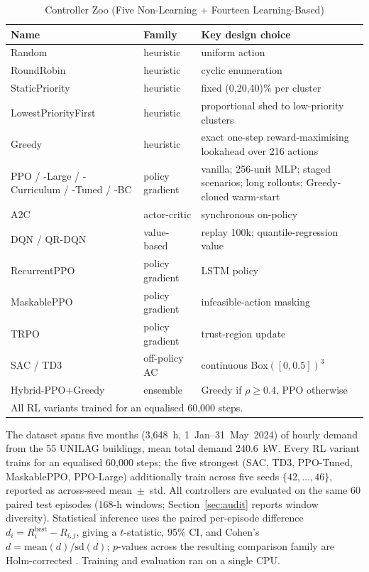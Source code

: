 \documentclass[9pt,conference]{IEEEtran}
\begin{document}
\begin{table}[tbp]
\caption{Controller Zoo (Five Non-Learning + Fourteen Learning-Based)}
\label{tab:zoo}
\begin{center}
\scriptsize
\begin{tabular}{|p{2.1cm}|p{1.3cm}|p{3.6cm}|}
\hline
\textbf{Name} & \textbf{Family} & \textbf{Key design choice} \\
\hline
Random & heuristic & uniform action \\
Round\-Robin & heuristic & cyclic enumeration \\
Static\-Priority & heuristic & fixed (0,20,40)\% per cluster \\
Lowest\-Priority\-First & heuristic & proportional shed to low-priority clusters \\
Greedy & heuristic & exact one-step reward-maximising lookahead over 216 actions \\
PPO / -Large / -Curriculum / -Tuned / -BC & policy gradient & vanilla; 256-unit MLP; staged scenarios; long rollouts; Greedy-cloned warm-start \\
A2C & actor-critic & synchronous on-policy \\
DQN / QR-DQN & value-based & replay 100k; quantile-regression value \\
Recurrent\-PPO & policy gradient & LSTM policy \\
Maskable\-PPO & policy gradient & infeasible-action masking \\
TRPO & policy gradient & trust-region update \\
SAC / TD3 & off-policy AC & continuous Box$([0,0.5])^3$ \\
Hybrid-PPO+Greedy & ensemble & Greedy if $\rho\ge0.4$, PPO otherwise \\
\hline
\multicolumn{3}{l}{\scriptsize All RL variants trained for an equalised 60{,}000 steps.}
\end{tabular}
\end{center}
\end{table}

The dataset spans five months (3{,}648~h, 1~Jan--31~May~2024) of hourly demand from the 55 UNILAG buildings, mean total demand 240.6~kW. Every RL variant trains for an equalised 60{,}000 steps; the five strongest (SAC, TD3, PPO-Tuned, MaskablePPO, PPO-Large) additionally train across five seeds $\{42,\dots,46\}$, reported as across-seed mean~$\pm$~std. All controllers are evaluated on the same 60 paired test episodes (168-h windows; Section~\ref{sec:audit} reports window diversity). Statistical inference uses the paired per-episode difference $d_i=R_i^{\mathrm{best}}-R_{i,j}$, giving a $t$-statistic, 95\% CI, and Cohen's $d=\mathrm{mean}(d)/\mathrm{sd}(d)$; $p$-values across the resulting comparison family are Holm-corrected \cite{holm1979}. Training and evaluation ran on a single CPU.
\end{document}
